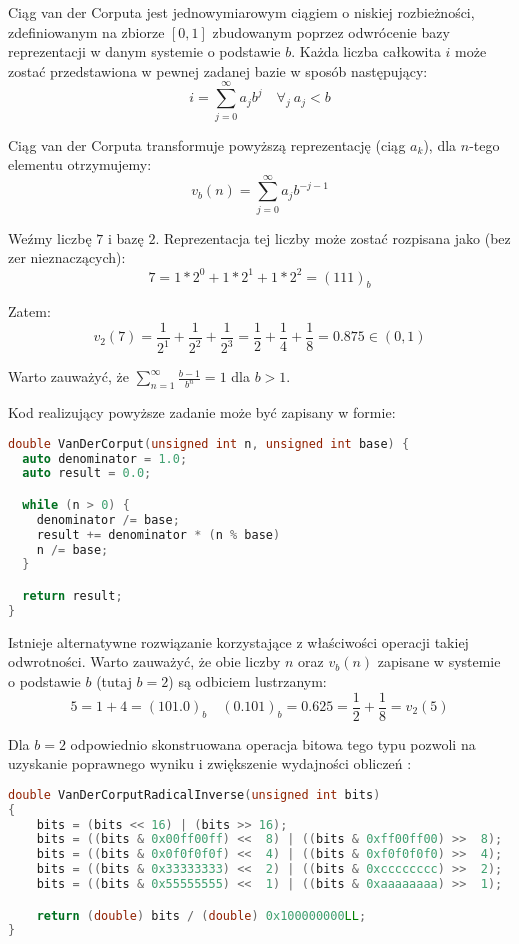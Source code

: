 \documentclass[../main.tex]{subfiles}
\begin{document}
Ciąg van der Corputa \cite{WongSamplingWH} jest jednowymiarowym ciągiem o
niskiej rozbieżności, zdefiniowanym na zbiorze $[0,1]$ zbudowanym poprzez
odwrócenie bazy reprezentacji w danym systemie o podstawie $b$. Każda liczba
całkowita $i$ może zostać przedstawiona w pewnej zadanej bazie w sposób
następujący:
\[ 
i = \sum_{j=0}^{\infty} {a_j b^j} \quad \forall_{j}\: a_j < b
\]

Ciąg van der Corputa transformuje powyższą reprezentację (ciąg $a_k$), dla $n$-tego elementu otrzymujemy:
\[ 
v_b(n) = \sum_{j=0}^{\infty} {a_j b^{-j-1}} 
\]

\begin{example}
  Weźmy liczbę $7$ i bazę $2$. Reprezentacja tej liczby może zostać rozpisana
  jako (bez zer nieznaczących):
  \[ 
  7 = 1 * 2^0 + 1 * 2^1 + 1 * 2^2 = (111)_{b} 
  \]

  \noindent Zatem:
  \[
    v_{2}(7)
      = \frac{1}{2^{1}} + \frac{1}{2^{2}} + \frac{1}{2^{3}}
      = \frac{1}{2} + \frac{1}{4} + \frac{1}{8}
      = 0.875
      \in (0,1)
  \]
\end{example}

Warto zauważyć, że $\sum_{n=1}^{\infty} \frac{b-1}{b^n} = 1$ dla $b>1$.

Kod realizujący powyższe zadanie może być zapisany w formie:

\begin{lstlisting}[language=c++]
double VanDerCorput(unsigned int n, unsigned int base) {
  auto denominator = 1.0;
  auto result = 0.0;

  while (n > 0) {
    denominator /= base;
    result += denominator * (n % base)
    n /= base;
  }

  return result;
}
\end{lstlisting}

Istnieje alternatywne rozwiązanie korzystające z właściwości operacji takiej
odwrotności. Warto zauważyć, że obie liczby $n$ oraz $v_b(n)$ zapisane w systemie o podstawie $b$ (tutaj $b=2$) są odbiciem lustrzanym:
\[
  5 = 1 + 4 = (101.0)_{b} \quad
  (0.101)_{b} = 0.625 = \frac{1}{2} + \frac{1}{8} = v_2(5)
\]

Dla $b=2$ odpowiednio skonstruowana operacja bitowa tego typu pozwoli na
uzyskanie poprawnego wyniku i zwiększenie wydajności obliczeń
\cite{dammertz_2012,MultidimensionalSampling}:

\begin{lstlisting}[language=c++]
double VanDerCorputRadicalInverse(unsigned int bits)
{
	bits = (bits << 16) | (bits >> 16);
	bits = ((bits & 0x00ff00ff) <<  8) | ((bits & 0xff00ff00) >>  8);
	bits = ((bits & 0x0f0f0f0f) <<  4) | ((bits & 0xf0f0f0f0) >>  4);
	bits = ((bits & 0x33333333) <<  2) | ((bits & 0xcccccccc) >>  2);
	bits = ((bits & 0x55555555) <<  1) | ((bits & 0xaaaaaaaa) >>  1);

	return (double) bits / (double) 0x100000000LL;
}
\end{lstlisting}
\end{document}
